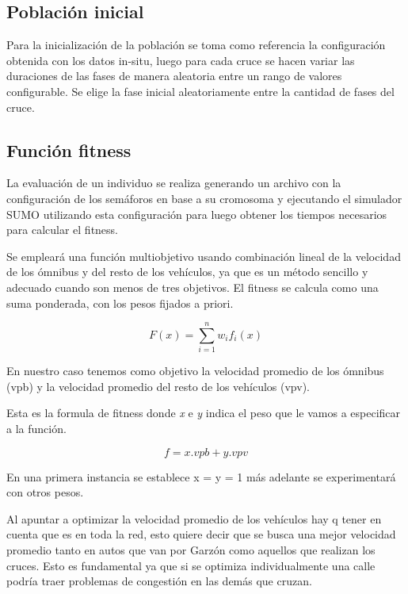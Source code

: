 \subsection{Población inicial}

Para la inicialización de la población se toma como referencia
la configuración obtenida con los datos in-situ, luego para cada
cruce se hacen variar las duraciones de las fases de manera aleatoria entre un rango de valores configurable. Se elige la fase inicial aleatoriamente entre la cantidad de fases del cruce.

\subsection{Función fitness}


La evaluación de un individuo se realiza generando un archivo con la configuración de los semáforos en base a su cromosoma y ejecutando el simulador SUMO utilizando esta configuración para luego obtener los tiempos necesarios para calcular el fitness.

Se empleará una función multiobjetivo usando combinación lineal de la velocidad de los ómnibus y del resto de los vehículos, ya que es un método sencillo y adecuado cuando son menos de tres objetivos. El fitness se calcula como una suma ponderada, con los pesos fijados a priori.

        \begin{equation}
        \label{eq:funcion_fitness_generica}
		F(x) = \sum_{i=1}^{n}{w_i}{f_i}(x)
        \end{equation}

En nuestro caso tenemos como objetivo la velocidad promedio de los ómnibus (vpb) y la velocidad promedio del resto de los vehículos (vpv).

Esta es la formula de fitness donde \emph{x} e \emph{y} indica el peso que le vamos a especificar a la función. 

        \begin{equation}
        \label{eq:funcion_fitness}
        f = x.vpb + y.vpv
        \end{equation}
        
En una primera instancia se establece x = y = 1 más adelante se experimentará con otros pesos.

Al apuntar a optimizar la velocidad promedio de los vehículos hay q tener en cuenta que es en toda la red, esto quiere decir que se busca una mejor velocidad promedio tanto en autos que van por Garzón como aquellos que realizan los cruces. Esto es fundamental ya que si se optimiza individualmente una calle podría traer problemas de congestión en las demás que cruzan.

